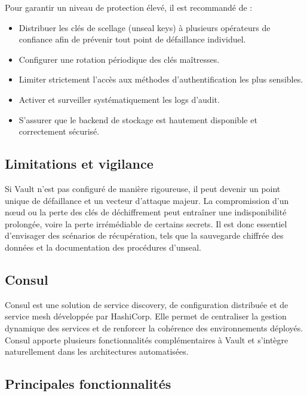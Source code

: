 Pour garantir un niveau de protection élevé, il est recommandé de :
\begin{itemize}
	\item Distribuer les clés de scellage (unseal keys) à plusieurs opérateurs de confiance afin de prévenir tout point de défaillance individuel.
	\item Configurer une rotation périodique des clés maîtresses.
	\item Limiter strictement l’accès aux méthodes d’authentification les plus sensibles.
	\item Activer et surveiller systématiquement les logs d’audit.
	\item S’assurer que le backend de stockage est hautement disponible et correctement sécurisé.
\end{itemize}

\subsection{Limitations et vigilance}

Si Vault n’est pas configuré de manière rigoureuse, il peut devenir un point unique de défaillance et un vecteur d’attaque majeur. La compromission d’un nœud ou la perte des clés de déchiffrement peut entraîner une indisponibilité prolongée, voire la perte irrémédiable de certains secrets. Il est donc essentiel d’envisager des scénarios de récupération, tels que la sauvegarde chiffrée des données et la documentation des procédures d’unseal.
\subsection{Consul}

Consul est une solution de service discovery, de configuration distribuée et de service mesh développée par HashiCorp. Elle permet de centraliser la gestion dynamique des services et de renforcer la cohérence des environnements déployés. Consul apporte plusieurs fonctionnalités complémentaires à Vault et s’intègre naturellement dans les architectures automatisées.

\subsection{Principales fonctionnalités}

